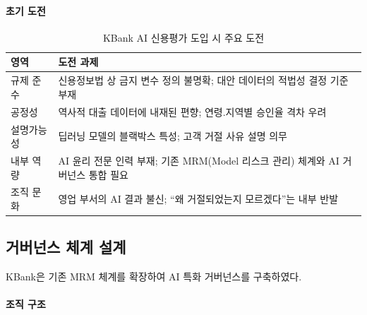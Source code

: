 \paragraph{초기 도전}

\begin{table}[htbp]
\centering
\caption{KBank AI 신용평가 도입 시 주요 도전}
\label{tab:kbank_challenges}
\begin{tabularx}{\textwidth}{p{3cm}X}
\toprule
\textbf{영역} & \textbf{도전 과제} \\
\midrule
규제 준수 & 
신용정보법 상 금지 변수 정의 불명확; 대안 데이터의 적법성 결정 기준 부재 \\
\midrule
공정성 & 
역사적 대출 데이터에 내재된 편향\cite{buolamwini2018gender}; 연령.지역별 승인율 격차 우려 \\
\midrule
설명가능성\cite{arrieta2020explainable} & 
딥러닝 모델의 블랙박스 특성; 고객 거절 사유 설명 의무 \\
\midrule
내부 역량 & 
AI 윤리 전문 인력 부재; 기존 MRM(Model 리스크 관리) 체계와 AI 거버넌스 통합 필요 \\
\midrule
조직 문화 & 
영업 부서의 AI 결과 불신\cite{davenport2018artificial}; ``왜 거절되었는지 모르겠다''는 내부 반발 \\
\bottomrule
\end{tabularx}
\end{table}


\subsection{거버넌스 체계 설계}
\label{sec:7.1.2}

KBank은 기존 MRM 체계를 확장하여 AI 특화 거버넌스\cite{occ2011sr117}를 구축하였다.

\paragraph{조직 구조}

